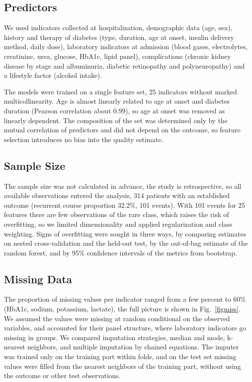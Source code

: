 \documentclass[pdflatex,sn-basic,Numbered]{sn-jnl}
\begin{document}
\subsection{Predictors}\label{subsec2_4}

We used indicators collected at hospitalization, demographic data (age, sex), history and therapy of diabetes (type, duration, age at onset, insulin delivery method, daily dose), laboratory indicators at admission (blood gases, electrolytes, creatinine, urea, glucose, HbA1c, lipid panel), complications (chronic kidney disease by stage and albuminuria, diabetic retinopathy and polyneuropathy) and a lifestyle factor (alcohol intake).

The models were trained on a single feature set, 25 indicators without marked multicollinearity. Age is almost linearly related to age at onset and diabetes duration (Pearson correlation about 0.99), so age at onset was removed as linearly dependent. The composition of the set was determined only by the mutual correlation of predictors and did not depend on the outcome, so feature selection introduces no bias into the quality estimate.

\subsection{Sample Size}\label{subsec2_5}

The sample size was not calculated in advance, the study is retrospective, so all available observations entered the analysis, 314 patients with an established outcome (recurrent course proportion 32.2\%, 101 events). With 101 events for 25 features there are few observations of the rare class, which raises the risk of overfitting, so we limited dimensionality and applied regularization and class weighting. Signs of overfitting were sought in three ways, by comparing estimates on nested cross-validation and the held-out test, by the out-of-bag estimate of the random forest, and by 95\% confidence intervals of the metrics from bootstrap.

\subsection{Missing Data}\label{subsec2_6}

The proportion of missing values per indicator ranged from a few percent to 60\% (HbA1c, sodium, potassium, lactate), the full picture is shown in Fig.~\ref{figmiss}. We assumed the values were missing at random conditional on the observed variables, and accounted for their panel structure, where laboratory indicators go missing in groups. We compared imputation strategies, median and mode, k-nearest neighbors, and multiple imputation by chained equations. The imputer was trained only on the training part within folds, and on the test set missing values were filled from the nearest neighbors of the training part, without using the outcome or other test observations.
\end{document}
